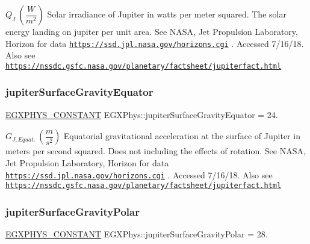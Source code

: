 $ Q_{J} \ (\dfrac{W}{m^2})$ Solar irradiance of Jupiter in watts per meter squared. The solar energy landing on jupiter per unit area. See N\+A\+SA, Jet Propulsion Laboratory, Horizon for data \href{https://ssd.jpl.nasa.gov/horizons.cgi}{\tt https\+://ssd.\+jpl.\+nasa.\+gov/horizons.\+cgi} . Accessed 7/16/18. Also see \href{https://nssdc.gsfc.nasa.gov/planetary/factsheet/jupiterfact.html}{\tt https\+://nssdc.\+gsfc.\+nasa.\+gov/planetary/factsheet/jupiterfact.\+html} \mbox{\label{group___e_g_x_phys-_constants-_astrophysics-_solar_system-_jupiter-_bulk_ga453ce834b062055a91b1fd594428fa6c}} 
\subsubsection{\texorpdfstring{jupiter\+Surface\+Gravity\+Equator}{jupiterSurfaceGravityEquator}}
{\footnotesize\ttfamily \mbox{\hyperlink{group___e_g_x_phys-_constants-_macros_ga76980d288494ce1714c9ac68a95ba702}{E\+G\+X\+P\+H\+Y\+S\+\_\+\+C\+O\+N\+S\+T\+A\+NT}} E\+G\+X\+Phys\+::jupiter\+Surface\+Gravity\+Equator = 24.}

$ G_{J,Equat.} \ (\dfrac{m}{s^2})$ Equatorial gravitational acceleration at the surface of Jupiter in meters per second squared. Does not including the effects of rotation. See N\+A\+SA, Jet Propulsion Laboratory, Horizon for data \href{https://ssd.jpl.nasa.gov/horizons.cgi}{\tt https\+://ssd.\+jpl.\+nasa.\+gov/horizons.\+cgi} . Accessed 7/16/18. Also see \href{https://nssdc.gsfc.nasa.gov/planetary/factsheet/jupiterfact.html}{\tt https\+://nssdc.\+gsfc.\+nasa.\+gov/planetary/factsheet/jupiterfact.\+html} \mbox{\label{group___e_g_x_phys-_constants-_astrophysics-_solar_system-_jupiter-_bulk_ga43cd8191d01a0990fd9104a4521b981b}} 
\subsubsection{\texorpdfstring{jupiter\+Surface\+Gravity\+Polar}{jupiterSurfaceGravityPolar}}
{\footnotesize\ttfamily \mbox{\hyperlink{group___e_g_x_phys-_constants-_macros_ga76980d288494ce1714c9ac68a95ba702}{E\+G\+X\+P\+H\+Y\+S\+\_\+\+C\+O\+N\+S\+T\+A\+NT}} E\+G\+X\+Phys\+::jupiter\+Surface\+Gravity\+Polar = 28.}

